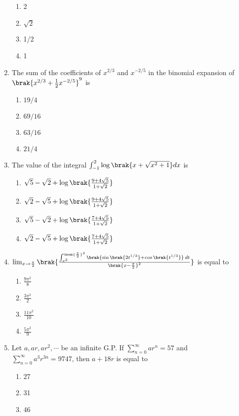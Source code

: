 \begin{enumerate}
\begin{enumerate}
        \item 2
        \item $\sqrt{2}$
        \item 1/2
        \item 1
    \end{enumerate}
    \item The sum of the coefficients of $x^{2/3}$ and $x^{-2/5}$ in the binomial expansion of $\brak{x^{2/3}+\frac{1}{2}x^{-2/5}}^9$ is
    \begin{enumerate}
        \item $19/4$
        \item $69/16$
        \item $63/16$
        \item $21/4$
    \end{enumerate}
    \item The value of the integral $\int_{-1}^{2} \log{\brak{x + \sqrt{x^{2}+1}}} dx$ is
    \begin{enumerate}
        \item $\sqrt{5}-\sqrt{2}+\log{\brak{\frac{9+4\sqrt{5}}{1+\sqrt{2}}}}$
        \item $\sqrt{2}-\sqrt{5}+\log{\brak{\frac{9+4\sqrt{5}}{1+\sqrt{2}}}}$
        \item $\sqrt{5}-\sqrt{2}+\log{\brak{\frac{7+4\sqrt{5}}{1+\sqrt{2}}}}$
        \item $\sqrt{2}-\sqrt{5}+\log{\brak{\frac{7+4\sqrt{5}}{1+\sqrt{2}}}}$
    \end{enumerate}
    \item $\lim_{x \to \frac{\pi}{2}} \brak{ \frac{\int_{x^3}^{\brak{ \frac{\pi}{2} }^3} \brak{ \sin \brak{ 2t^{1/3} } + \cos \brak{ t^{1/3} } } \, dt }{\brak{x - \frac{\pi}{2}}^2} }$ is equal to
    \begin{enumerate}
        \item $\frac{9\pi^2}{8}$
        \item $\frac{3\pi^2}{2}$
        \item $\frac{11\pi^2}{10}$
        \item $\frac{5\pi^2}{9}$
    \end{enumerate}
    \item Let $a,ar,ar^2,\cdots$ be an infinite G.P. If $\sum_{n=0}^{\infty}ar^n=57$ and $\sum_{n=0}^{\infty}a^3r^{3n}=9747$, then $a+18r$ is equal to 
    \begin{enumerate}
    	\item 27
    	\item 31
    	\item 46

\end{enumerate}
\end{enumerate}
